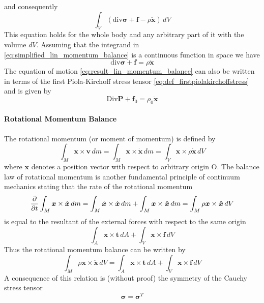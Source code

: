 and consequently
\begin{equation}
    \int_{V}^{} (\text{div}\bm{\sigma} + \bm{f} -\rho\ddot{\bm{x}}) \,dV
    \label{eq:simplified_lin_momentum_balance}
\end{equation}
This equation holds for the whole body and any arbitrary part of it with the volume \(dV\). Assuming that the integrand in \cref{eq:simplified_lin_momentum_balance} is a continuous function in space we have
\begin{equation}
    \text{div}\bm{\sigma} + \bm{f} = \rho\ddot{\bm{x}}
    \label{eq:result_lin_momentum_balance}
\end{equation}
The equation of motion \cref{eq:result_lin_momentum_balance} can also be written in terms of the first Piola-Kirchoff stress tensor \cref{eq:def_firstpiolakirchoffstress} and is given by 
\begin{equation}
    \text{Div}\mathbf{P} + \bm{f}_{0} = \rho_{0}\ddot{\bm{x}}
    \label{eq:result_lin_momentum_balance_2}
\end{equation}

\paragraph*{Rotational Momentum Balance}
The rotational momentum (or moment of momentum) is defined by 
\begin{equation}
    \int_{M}^{}\bm{x} \times \bm{v} \,dm 
    =  \int_{M}^{}\bm{x} \times \dot{\bm{x}} \,dm 
    =  \int_{V}^{}\bm{x} \times \rho\dot{\bm{x}} \,dV 
\end{equation}
where \(\bm{x}\) denotes a position vector with respect to arbitrary origin O. The balance law of rotational momentum is another fundamental principle of continuum mechanics stating that the rate of the rotational momentum
\begin{equation}
    \pdv*{\int_{M}^{} \bm{x} \times \dot{\bm{x}} \,dm }{t} 
    = \int_{M}^{} \dot{\bm{x}} \times \dot{\bm{x}} \,dm 
    + \int_{M}^{} \bm{x} \times \ddot{\bm{x}} \,dm 
    = \int_{M}^{} \rho \bm{x} \times \ddot{\bm{x}} \,dV
\end{equation}
is equal to the resultant of the external forces with respect to the same origin 
\begin{equation}
    \int_{A}^{}\bm{x} \times \bm{t} \,dA
    + \int_{V}^{}\bm{x} \times \bm{f} \,dV 
\end{equation}
Thus the rotational momentum balance can be written by 
\begin{equation}
    \int_{M}^{} \rho \bm{x} \times \ddot{\bm{x}} \,dV  
    = \int_{A}^{}\bm{x} \times \bm{t} \,dA
    + \int_{V}^{}\bm{x} \times \bm{f} \,dV 
\end{equation}
A consequence of this relation is (without proof) the symmetry of the Cauchy stress tensor
\begin{equation}
    \bm{\sigma} = \bm{\sigma}^{T}
\end{equation}
